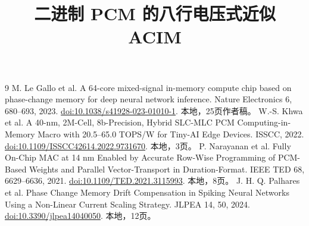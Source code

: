 \documentclass[11pt,a4paper,fontset=fandol]{ctexart}
\title{\bfseries 二进制 PCM 的八行电压式近似 ACIM}\author{}\date{}
\begin{document}
\maketitle\vspace{-2em}


\begin{thebibliography}{9}\small
{} M. Le Gallo et al. A 64-core mixed-signal in-memory compute chip based on phase-change memory for deep neural network inference. Nature Electronics 6, 680--693, 2023. \href{https://doi.org/10.1038/s41928-023-01010-1}{doi:10.1038/s41928-023-01010-1}. 本地，25页作者稿。
 W.-S. Khwa et al. A 40-nm, 2M-Cell, 8b-Precision, Hybrid SLC-MLC PCM Computing-in-Memory Macro with 20.5--65.0 TOPS/W for Tiny-AI Edge Devices. ISSCC, 2022. \href{https://doi.org/10.1109/ISSCC42614.2022.9731670}{doi:10.1109/ISSCC42614.2022.9731670}. 本地，3页。
 P. Narayanan et al. Fully On-Chip MAC at 14 nm Enabled by Accurate Row-Wise Programming of PCM-Based Weights and Parallel Vector-Transport in Duration-Format. IEEE TED 68, 6629--6636, 2021. \href{https://doi.org/10.1109/TED.2021.3115993}{doi:10.1109/TED.2021.3115993}. 本地，8页。
 J. H. Q. Palhares et al. Phase Change Memory Drift Compensation in Spiking Neural Networks Using a Non-Linear Current Scaling Strategy. JLPEA 14, 50, 2024. \href{https://doi.org/10.3390/jlpea14040050}{doi:10.3390/jlpea14040050}. 本地，12页。
\end{thebibliography}
\end{document}
